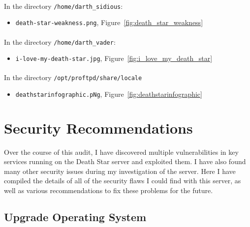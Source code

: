 \documentclass{article}
\begin{document}
\paragraph{}
In the directory \texttt{/home/darth\_sidious}:
\begin{itemize}
	\item \texttt{death-star-weakness.png}, Figure~\ref{fig:death_star_weakness}
\end{itemize}

\paragraph{}
In the directory \texttt{/home/darth\_vader}:
\begin{itemize}
	\item \texttt{i-love-my-death-star.jpg}, Figure~\ref{fig:i_love_my_death_star}
\end{itemize}

\paragraph{}
In the directory \texttt{/opt/proftpd/share/locale}
\begin{itemize}
	\item \texttt{deathstarinfographic.pNg}, Figure~\ref{fig:deathstarinfographic}
\end{itemize}

\newpage

\section{Security Recommendations}
\label{sec:security_recommendations}
\paragraph{}
Over the course of this audit, I have discovered multiple vulnerabilities in key services running on the Death Star server and exploited them.
I have also found many other security issues during my investigation of the server.
Here I have compiled the details of all of the security flaws I could find with this server, as well as various recommendations to fix these problems for the future.

\subsection{Upgrade Operating System}
\label{subsec:upgrade_os}
\end{document}
